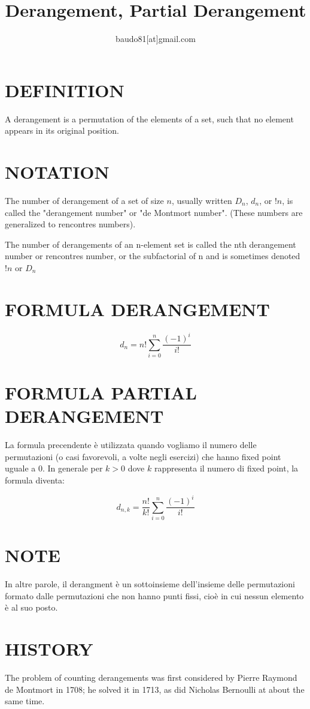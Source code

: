 \documentclass[a4paper,10pt]{article}
\title{Derangement, Partial Derangement}
\author{baudo81[at]gmail.com}
\begin{document}
\maketitle

\section{DEFINITION}
A derangement is a permutation of the elements of a set, such that no element appears in its original 
position. \cite{derangement}

\section{NOTATION}
The number of derangement of a set of size $n$, usually written $D_{n}$, $d_{n}$, or $!n$, is called the "derangement number" or
"de Montmort number". (These numbers are generalized to rencontres numbers). \cite{derangement}

The number of derangements of an n-element set is called the nth derangement number or rencontres number, or the subfactorial
of n and is sometimes denoted $!n$ or $D_{n}$

\section{FORMULA DERANGEMENT}
\[
 d_{n} = n!\sum^{n}_{i=0} \frac{(-1)^i}{i!}
\]

\section{FORMULA PARTIAL DERANGEMENT}
La formula precendente è utilizzata quando vogliamo il numero delle permutazioni (o casi favorevoli, a volte negli esercizi) che hanno fixed point uguale a 0.
In generale per $k>0$ dove $k$ rappresenta il numero di fixed point, la formula diventa:

\[
 d_{n,k} = \frac{n!}{k!}\sum^{n}_{i=0} \frac{(-1)^i}{i!}
\]

\section{NOTE}
In altre parole, il derangment è un sottoinsieme dell'insieme delle permutazioni formato dalle permutazioni che non hanno punti fissi, cioè 
in cui nessun elemento è al suo posto.

\section{HISTORY}
The problem of counting derangements was first considered by Pierre Raymond de Montmort in 1708; he solved it in 1713, as did
Nicholas Bernoulli at about the same time. \cite{derangement}
\end{document}
